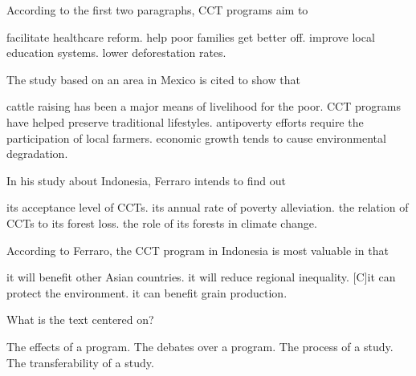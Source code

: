 \item According to the first two paragraphs, CCT programs aim to
\begin{tasks}
	\task facilitate healthcare reform.
	\task help poor families get better off.
	\task improve local education systems.
	\task lower deforestation rates.
\end{tasks}
\item The study based on an area in Mexico is cited to show that
\begin{tasks}
	\task cattle raising has been a major means of livelihood for the poor.
	\task CCT programs have helped preserve traditional lifestyles.
	\task antipoverty efforts require the participation of local farmers.
	\task economic growth tends to cause environmental degradation.
\end{tasks}
\item In his study about Indonesia, Ferraro intends to find out
\begin{tasks}
	\task its acceptance level of CCTs.
	\task its annual rate of poverty alleviation.
	\task the relation of CCTs to its forest loss.
	\task the role of its forests in climate change.
\end{tasks}
\item According to Ferraro, the CCT program in Indonesia is most valuable in that
\begin{tasks}
	\task it will benefit other Asian countries.
	\task it will reduce regional inequality.
		[C]it can protect the environment.
	\task it can benefit grain production.
\end{tasks}
\item What is the text centered on?
\begin{tasks}
	\task The effects of a program.
	\task The debates over a program.
	\task The process of a study.
	\task The transferability of a study.
\end{tasks}